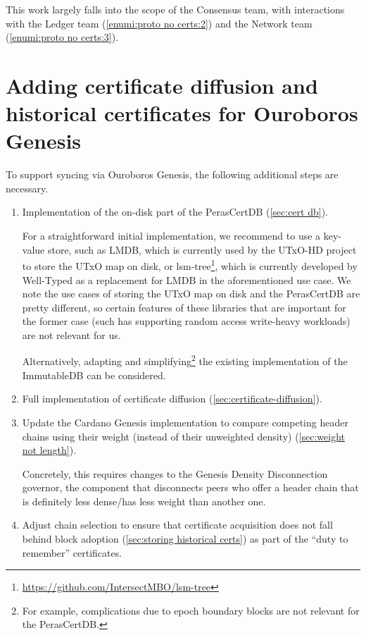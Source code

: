 This work largely falls into the scope of the Consensus team, with interactions with the Ledger team (\ref{enumi:proto no certs:2}) and the Network team (\ref{enumi:proto no certs:3}).

\section{Adding certificate diffusion and historical certificates for Ouroboros Genesis}\label{sec:implementation with genesis}

To support syncing via Ouroboros Genesis, the following additional steps are necessary.
\begin{enumerate}
\item
  Implementation of the on-disk part of the PerasCertDB (\cref{sec:cert db}).

  For a straightforward initial implementation, we recommend to use a key-value store, such as LMDB, which is currently used by the UTxO-HD project to store the UTxO map on disk, or lsm-tree\footnote{\url{https://github.com/IntersectMBO/lsm-tree}}, which is currently developed by Well-Typed as a replacement for LMDB in the aforementioned use case.
  We note the use cases of storing the UTxO map on disk and the PerasCertDB are pretty different, so certain features of these libraries that are important for the former case (such has supporting random access write-heavy workloads) are not relevant for us.

  Alternatively, adapting and simplifying\footnote{For example, complications due to epoch boundary blocks are not relevant for the PerasCertDB.} the existing implementation of the ImmutableDB can be considered.
\item
  Full implementation of certificate diffusion (\cref{sec:certificate-diffusion}).
\item
  Update the Cardano Genesis implementation \parencite{genesis-implementation-documentation} to compare competing header chains using their weight (instead of their unweighted density) (\cref{sec:weight not length}).

  Concretely, this requires changes to the Genesis Density Disconnection governor, the component that disconnects peers who offer a header chain that is definitely less dense/has less weight than another one.
\item
  Adjust chain selection to ensure that certificate acquisition does not fall behind block adoption (\cref{sec:storing historical certs}) as part of the \enquote{duty to remember} certificates.
\end{enumerate}

